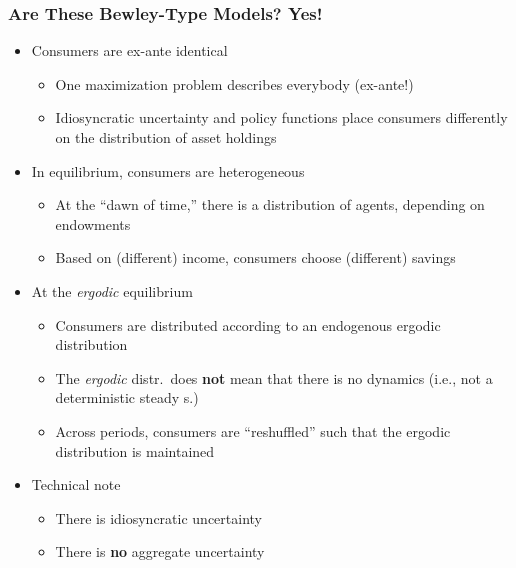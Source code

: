 \documentclass[10pt, aspectratio=1610, natbib, handout]{beamer}
\begin{document}
  \begin{frame}
    \frametitle{Are These Bewley-Type Models? Yes!}

    \begin{itemize}
      \item Consumers are ex-ante identical
        \begin{itemize}
          \item One maximization problem describes everybody (ex-ante!)
          \item Idiosyncratic uncertainty and policy functions place consumers differently on the distribution of asset holdings
        \end{itemize}

      \vfill\pause

      \item In equilibrium, consumers are heterogeneous
        \begin{itemize}
          \item At the ``dawn of time,'' there is a distribution of agents, depending on endowments
          \item Based on (different) income, consumers choose (different) savings
        \end{itemize}

      \vfill\pause

      \item At the \textit{ergodic} equilibrium
        \begin{itemize}
          \item Consumers are distributed according to an endogenous ergodic distribution
          \item The \textit{ergodic} distr.~does \textbf{not} mean that there is no dynamics (i.e., not a deterministic steady s.)
          \item Across periods, consumers are ``reshuffled'' such that the ergodic distribution is maintained
        \end{itemize}

      \vfill\pause

      \item Technical note
        \begin{itemize}
          \item There is idiosyncratic uncertainty
          \item There is \textbf{no} aggregate uncertainty
        \end{itemize}
    \end{itemize}

  \end{frame}
\end{document}
